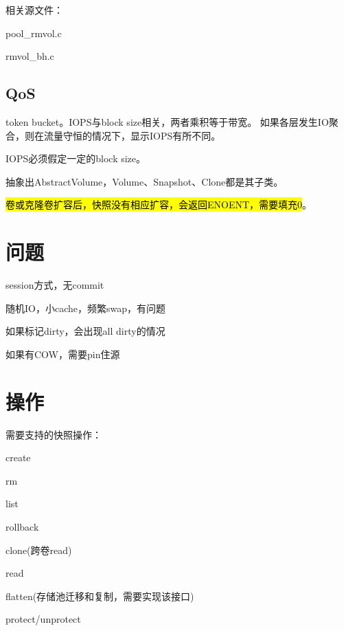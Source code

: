 相关源文件：
\begin{compactitem}
\item pool\_rmvol.c
\item rmvol\_bh.c
\end{compactitem}


\subsection{QoS}

token bucket。IOPS与block size相关，两者乘积等于带宽。
如果各层发生IO聚合，则在流量守恒的情况下，显示IOPS有所不同。

IOPS必须假定一定的block size。

抽象出AbstractVolume，Volume、Snapshot、Clone都是其子类。

\hl{卷或克隆卷扩容后，快照没有相应扩容，会返回ENOENT，需要填充0}。

\section{问题}

\begin{enumbox}
\item session方式，无commit
\item 随机IO，小cache，频繁swap，有问题
\item 如果标记dirty，会出现all dirty的情况
\item 如果有COW，需要pin住源
\end{enumbox}

\section{操作}

需要支持的快照操作：
\begin{enumbox}
\item create
\item rm
\item list
\item rollback
\item clone(跨卷read)
\item read
\item flatten(存储池迁移和复制，需要实现该接口)
\item protect/unprotect
\end{enumbox}

